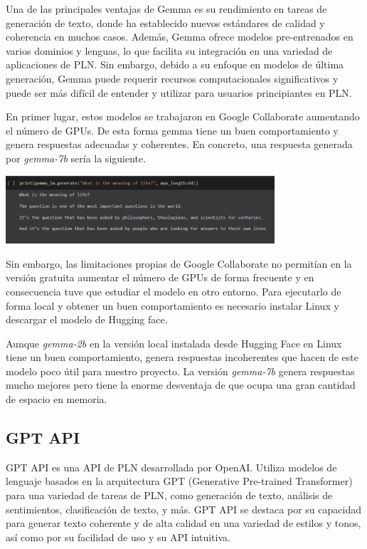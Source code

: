 Una de las principales ventajas de Gemma es su rendimiento en tareas de generación de texto, donde ha establecido nuevos estándares de calidad y coherencia en muchos casos. Además, Gemma ofrece modelos pre-entrenados en varios dominios y lenguas, lo que facilita su integración en una variedad de aplicaciones de PLN. Sin embargo, debido a su enfoque en modelos de última generación, Gemma puede requerir recursos computacionales significativos y puede ser más difícil de entender y utilizar para usuarios principiantes en PLN.


En primer lugar, estos modelos se trabajaron en Google Collaborate aumentando el número de GPUs. De esta forma gemma tiene un buen comportamiento y genera respuestas adecuadas y coherentes. En concreto, una respuesta generada por \textit{gemma-7b} sería la siguiente.
\begin{center}
	\includegraphics[width=0.75\textwidth]{Imagenes/gemma (1)}
\end{center}
Sin embargo, las limitaciones propias de Google Collaborate no permitían en la versión gratuita aumentar el número de GPUs de forma frecuente y en consecuencia tuve que estudiar el modelo en otro entorno. Para ejecutarlo de forma local y obtener un buen comportamiento es necesario instalar Linux y descargar el modelo de Hugging face. 

Aunque \textit{gemma-2b} en la versión local instalada desde Hugging Face en Linux tiene un buen comportamiento, genera respuestas incoherentes que hacen de este modelo poco útil para nuestro proyecto. La versión \textit{gemma-7b} genera respuestas mucho mejores pero tiene la enorme desventaja de que ocupa una gran cantidad de espacio en memoria.

\subsection{GPT API}

GPT API es una API de PLN desarrollada por OpenAI. Utiliza modelos de lenguaje basados en la arquitectura GPT (Generative Pre-trained Transformer) para una variedad de tareas de PLN, como generación de texto, análisis de sentimientos, clasificación de texto, y más. GPT API se destaca por su capacidad para generar texto coherente y de alta calidad en una variedad de estilos y tonos, así como por su facilidad de uso y su API intuitiva.

